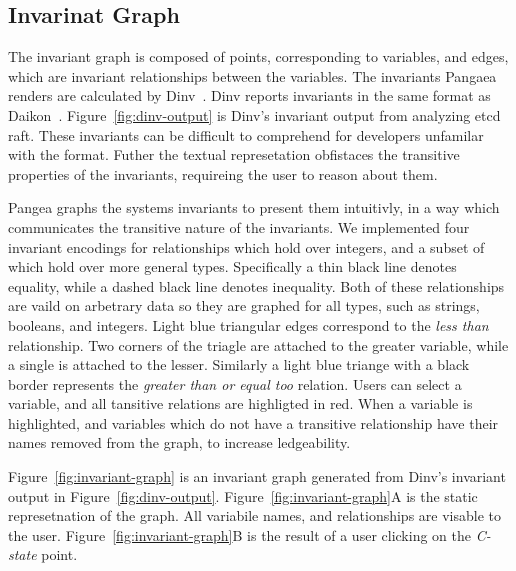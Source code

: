 \subsection{Invarinat Graph}
\label{invariant-graph}

The invariant graph is composed of points, corresponding to variables,
and edges, which are invariant relationships between the variables.
The invariants Pangaea renders are calculated by Dinv~\cite{dinv}.
Dinv reports invariants in the same format as Daikon~\cite{Ernst01}.
Figure~\ref{fig:dinv-output} is Dinv's invariant output from analyzing
etcd raft. These invariants can be difficult to comprehend for
developers unfamilar with the format. Futher the textual represetation
obfistaces the transitive properties of the invariants, requireing the
user to reason about them.

Pangea graphs the systems invariants to present them intuitivly, in a
way which communicates the transitive nature of the invariants. We
implemented four invariant encodings for relationships which hold over
integers, and a subset of which hold over more general types.
Specifically a thin black line denotes equality, while a dashed black
line denotes inequality. Both of these relationships are vaild on
arbetrary data so they are graphed for all types, such as strings,
booleans, and integers. Light blue triangular edges correspond to the
\emph{less than} relationship. Two corners of the triagle are attached
to the greater variable, while a single is attached to the lesser.
Similarly a light blue triange with a black border represents the
\emph{greater than or equal too} relation. Users can select a
variable, and all tansitive relations are highligted in red. When a
variable is highlighted, and variables which do not have a transitive
relationship have their names removed from the graph, to increase
ledgeability.

Figure~\ref{fig:invariant-graph} is an invariant graph generated from
Dinv's invariant output in Figure~\ref{fig:dinv-output}.
Figure~\ref{fig:invariant-graph}A is the static represetnation of the
graph.  All variabile names, and relationships are visable to the
user. Figure~\ref{fig:invariant-graph}B is the result of a user clicking
on the \emph{C-state} point.

